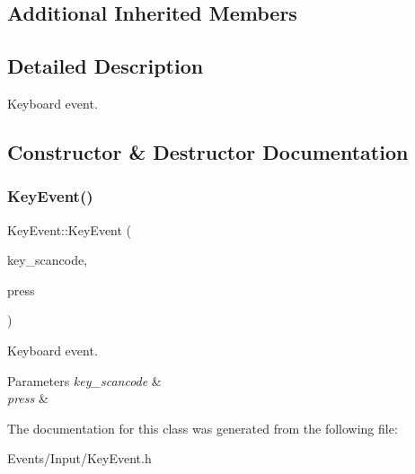 \subsection*{Additional Inherited Members}


\subsection{Detailed Description}
Keyboard event. 

\subsection{Constructor \& Destructor Documentation}
\mbox{\label{classKeyEvent_ac4916846f8db231e87b912a3c15efb93}} 
\subsubsection{\texorpdfstring{Key\+Event()}{KeyEvent()}}
{\footnotesize\ttfamily Key\+Event\+::\+Key\+Event (\begin{DoxyParamCaption}\item[{S\+D\+L\+\_\+\+Scancode}]{key\+\_\+scancode,  }\item[{bool}]{press }\end{DoxyParamCaption})\hspace{0.3cm}{\ttfamily [inline]}}



Keyboard event. 


\begin{DoxyParams}{Parameters}
{\em key\+\_\+scancode} & \\
\hline
{\em press} & \\
\hline
\end{DoxyParams}


The documentation for this class was generated from the following file\+:\begin{DoxyCompactItemize}
\item 
Events/\+Input/Key\+Event.\+h\end{DoxyCompactItemize}
